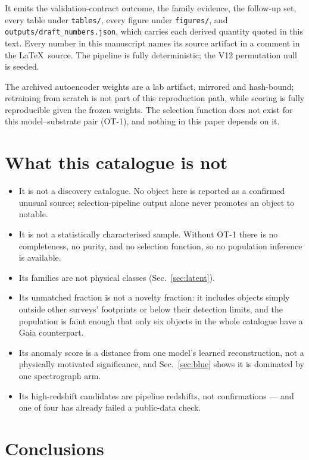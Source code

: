 \documentclass[aps,prd,twocolumn,superscriptaddress,nofootinbib,longbibliography,floatfix]{revtex4-2}
\begin{document}
\noindent It emits the validation-contract outcome, the family evidence, the
follow-up set, every table under \texttt{tables/}, every figure under
\texttt{figures/}, and \texttt{outputs/draft\_numbers.json}, which carries
each derived quantity quoted in this text. Every number in this manuscript
names its source artifact in a comment in the \LaTeX\ source. The pipeline is
fully deterministic; the V12 permutation null is seeded.

The archived autoencoder weights are a lab artifact, mirrored and hash-bound;
retraining from scratch is not part of this reproduction path, while scoring
is fully reproducible given the frozen weights. The selection function does
not exist for this model--substrate pair (OT-1), and nothing in this paper
depends on it.

\section{What this catalogue is not}
\label{sec:limits}

\begin{itemize}[leftmargin=1.2em,itemsep=2pt]
  \item It is not a discovery catalogue. No object here is reported as a
    confirmed unusual source; selection-pipeline output alone never promotes
    an object to notable.
  \item It is not a statistically characterised sample. Without OT-1 there is
    no completeness, no purity, and no selection function, so no population
    inference is available.
  \item Its families are not physical classes (Sec.~\ref{sec:latent}).
  \item Its unmatched fraction is not a novelty fraction: it includes objects
    simply outside other surveys' footprints or below their detection limits,
    and the population is faint enough that only six objects in the whole
    catalogue have a Gaia counterpart.
  \item Its anomaly score is a distance from one model's learned
    reconstruction, not a physically motivated significance, and
    Sec.~\ref{sec:blue} shows it is dominated by one spectrograph arm.
  \item Its high-redshift candidates are pipeline redshifts, not
    confirmations --- and one of four has already failed a public-data check.
\end{itemize}

\section{Conclusions}
\label{sec:conclusions}
\end{document}
